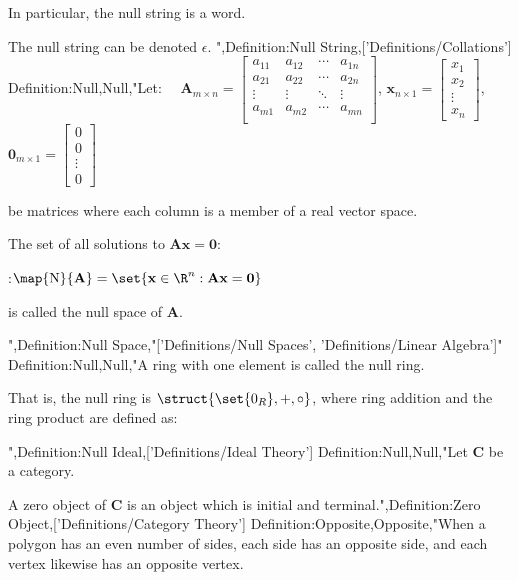 In particular, the null string is a word.


The null string can be denoted $\epsilon$.
",Definition:Null String,['Definitions/Collations']
Definition:Null,Null,"Let:
$\quad \mathbf A_{m \times n} = \begin {bmatrix}
a_{11} & a_{12} & \cdots & a_{1n} \\
a_{21} & a_{22} & \cdots & a_{2n} \\
\vdots & \vdots & \ddots & \vdots \\
a_{m1} & a_{m2} & \cdots & a_{mn} \\
\end {bmatrix}$,  $\mathbf x_{n \times 1} = \begin {bmatrix} x_1 \\ x_2 \\ \vdots \\ x_n \end {bmatrix}$, $\mathbf 0_{m \times 1} = \begin {bmatrix} 0 \\ 0 \\ \vdots \\ 0 \end {bmatrix}$

be matrices where each column is a member of a real vector space.

The set of all solutions to $\mathbf A \mathbf x = \mathbf 0$:

:$\map {\mathrm N} {\mathbf A} = \set {\mathbf x \in \R^n : \mathbf {A x} = \mathbf 0}$

is called the null space of $\mathbf A$.



",Definition:Null Space,"['Definitions/Null Spaces', 'Definitions/Linear Algebra']"
Definition:Null,Null,"A ring with one element is called the null ring.

That is, the null ring is $\struct {\set {0_R}, +, \circ}$, where ring addition and the ring product are defined as:





",Definition:Null Ideal,['Definitions/Ideal Theory']
Definition:Null,Null,"Let $\mathbf C$ be a category.


A zero object of $\mathbf C$ is an object which is initial and terminal.",Definition:Zero Object,['Definitions/Category Theory']
Definition:Opposite,Opposite,"When a polygon has an even number of sides, each side has an opposite side, and each vertex likewise has an opposite vertex.


